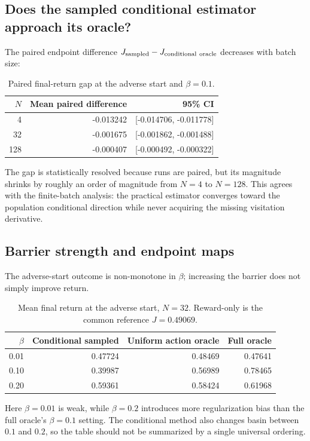 \documentclass[10pt,a4paper]{article}
\begin{document}
\subsection{Does the sampled conditional estimator approach its oracle?}
The paired endpoint difference
$J_{\rm sampled}-J_{\rm conditional\ oracle}$ decreases with batch size:
\begin{table}[htbp]
\centering\small
\caption{Paired final-return gap at the adverse start and $\beta=0.1$.}
\label{tab:paired}
\begin{tabular}{rrr}
\toprule
$N$ & Mean paired difference & 95\% CI \\
\midrule
4   & -0.013242 & [-0.014706, -0.011778] \\
32  & -0.001675 & [-0.001862, -0.001488] \\
128 & -0.000407 & [-0.000492, -0.000322] \\
\bottomrule
\end{tabular}
\end{table}
The gap is statistically resolved because runs are paired, but its magnitude
shrinks by roughly an order of magnitude from $N=4$ to $N=128$. This agrees
with the finite-batch analysis: the practical estimator converges toward the
population conditional direction while never acquiring the missing
visitation derivative.

\subsection{Barrier strength and endpoint maps}
The adverse-start outcome is non-monotone in $\beta$; increasing the barrier
does not simply improve return.
\begin{table}[htbp]
\centering\small
\caption{Mean final return at the adverse start, $N=32$. Reward-only is the
common reference $J=0.49069$.}
\label{tab:beta}
\begin{tabular}{rrrr}
\toprule
$\beta$ & Conditional sampled & Uniform action oracle & Full oracle \\
\midrule
0.01 & 0.47724 & 0.48469 & 0.47641 \\
0.10 & 0.39987 & 0.56989 & 0.78465 \\
0.20 & 0.59361 & 0.58424 & 0.61968 \\
\bottomrule
\end{tabular}
\end{table}
Here $\beta=0.01$ is weak, while $\beta=0.2$ introduces more regularization
bias than the full oracle's $\beta=0.1$ setting. The conditional method also
changes basin between $0.1$ and $0.2$, so the table should not be summarized by
a single universal ordering.
\end{document}
